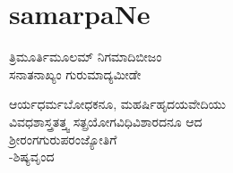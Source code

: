 
\section*{samarpaNe}



\begin{shloka}
ತ್ರಿಮೂರ್ತಿಮೂಲಮ್ ನಿಗಮಾದಿಬೀಜಂ \\
ಸನಾತನಾಖ್ಯಂ ಗುರುಮಾದ್ಯಮೀಡೇ
\end{shloka}

\begin{shloka}
ಆರ್ಯಧರ್ಮಬೋಧಕನೂ, ಮಹರ್ಷಿಹೃದಯವೇದಿಯು\\
ವಿವಧಶಾಸ್ತ್ರತತ್ತ್ವ  ಸತ್ಪ್ರಯೋಗವಿಧಿವಿಶಾರದನೂ ಆದ \\
ಶ್ರೀರಂಗಗುರುಪರಂಜ್ಯೋತಿಗೆ \\
\hfill {-ಶಿಷ್ಯವೃಂದ}
\end{shloka}
